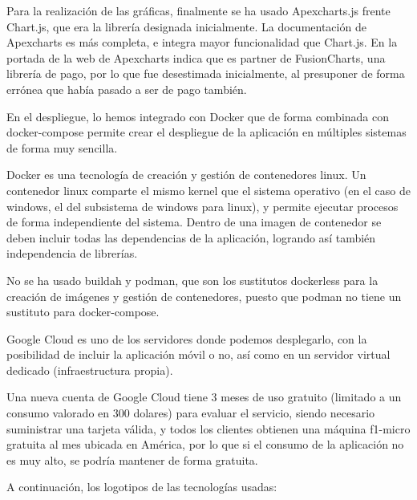 \documentclass[11pt,spanish,listoffigures,listoftables]{tfgetsinf}
\begin{document}
Para la realización de las gráficas, finalmente se ha usado Apexcharts.js frente Chart.js, que era la librería designada inicialmente. La documentación de Apexcharts es más completa, e integra mayor funcionalidad que Chart.js. 
En la portada de la web de Apexcharts indica que es partner de FusionCharts, una librería de pago, por lo que fue desestimada inicialmente, al presuponer de forma errónea que había pasado a ser de pago también.

En el despliegue, lo hemos integrado con Docker que de forma combinada con docker-compose permite crear el despliegue de la aplicación en múltiples sistemas de forma muy sencilla.

Docker es una tecnología de creación y gestión de contenedores linux. 
Un contenedor linux comparte el mismo kernel que el sistema operativo (en el caso de windows, el del subsistema de windows para linux), y permite ejecutar procesos de forma independiente del sistema. 
Dentro de una imagen de contenedor se deben incluir todas las dependencias de la aplicación, logrando así también independencia de librerías.

No se ha usado buildah y podman, que son los sustitutos dockerless para la creación de imágenes y gestión de contenedores, puesto que podman no tiene un sustituto para docker-compose.

Google Cloud es uno de los servidores donde podemos desplegarlo, con la posibilidad de incluir la aplicación móvil o no, así como en un servidor virtual dedicado (infraestructura propia). 

Una nueva cuenta de Google Cloud tiene 3 meses de uso gratuito (limitado a un consumo valorado en 300 dolares) para evaluar el servicio, siendo necesario suministrar una tarjeta válida, y todos los clientes obtienen una máquina f1-micro gratuita al mes ubicada en América, por lo que si el consumo de la aplicación no es muy alto, se podría mantener de forma gratuita.

A continuación, los logotipos de las tecnologías usadas:
\end{document}

